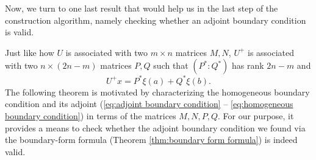 \documentclass[11pt, oneside, a4paper]{article}
\begin{document}
Now, we turn to one last result that would help us in the last step of the construction algorithm, namely checking whether an adjoint boundary condition is valid.

Just like how $U$ is associated with two $m\times n$ matrices $M, N$, $U^+$ is associated with two $n\times (2n-m)$ matrices $P, Q$ such that $(P^*:Q^*)$ has rank $2n-m$ and
\begin{equation}\label{eq:U^+x in P* Q*}
    U^+x = P^*\xi(a) + Q^*\xi(b).
\end{equation}
The following theorem is motivated by characterizing the homogeneous boundary condition and its adjoint (\eqref{eq:adjoint boundary condition} -- \eqref{eq:homogeneous boundary condition}) in terms of the matrices $M, N, P, Q$. For our purpose, it provides a means to check whether the adjoint boundary condition we found via the boundary-form formula (Theorem \ref{thm:boundary form formula}) is indeed valid.
\end{document}
